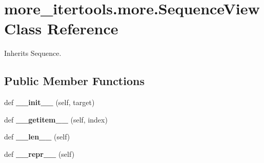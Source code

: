 \hypertarget{classmore__itertools_1_1more_1_1_sequence_view}{}\section{more\+\_\+itertools.\+more.\+Sequence\+View Class Reference}
\label{classmore__itertools_1_1more_1_1_sequence_view}


Inherits Sequence.

\subsection*{Public Member Functions}
\begin{DoxyCompactItemize}
\item 
\mbox{\label{classmore__itertools_1_1more_1_1_sequence_view_a02621f6affd3ce27bdea5d280e9d1615}} 
def {\bfseries \+\_\+\+\_\+init\+\_\+\+\_\+} (self, target)
\item 
\mbox{\label{classmore__itertools_1_1more_1_1_sequence_view_acf77727d13e1c1a801b71dc0459f1a5d}} 
def {\bfseries \+\_\+\+\_\+getitem\+\_\+\+\_\+} (self, index)
\item 
\mbox{\label{classmore__itertools_1_1more_1_1_sequence_view_afee6f4b4b8ff270ef141b1ea1f68fef2}} 
def {\bfseries \+\_\+\+\_\+len\+\_\+\+\_\+} (self)
\item 
\mbox{\label{classmore__itertools_1_1more_1_1_sequence_view_a33a43f23a8d10a217090642f6295db8f}} 
def {\bfseries \+\_\+\+\_\+repr\+\_\+\+\_\+} (self)
\end{DoxyCompactItemize}


